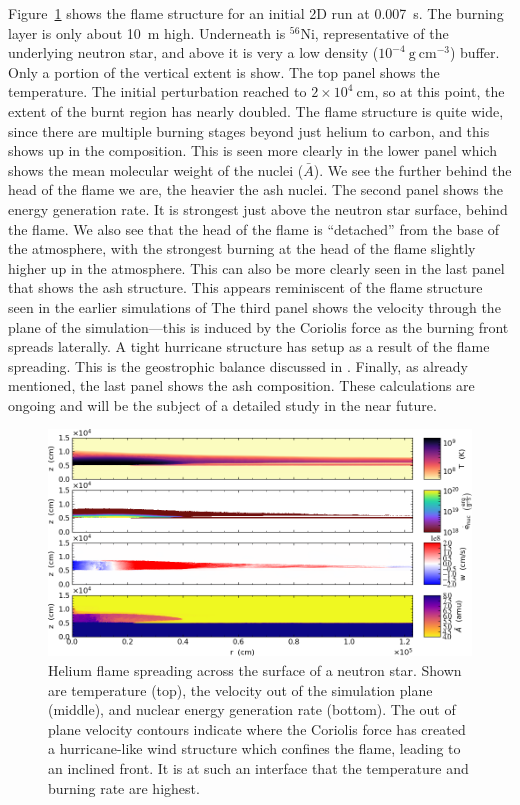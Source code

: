 \documentclass[a4paper]{jpconf}
\newcommand{\isot}[2]{$^{#2}\mathrm{#1}$}
\newcommand{\gcc}{\mathrm{g~cm^{-3} }}
\newcommand{\MarginPar}[1]{\marginpar{\vskip-\baselineskip\raggedright\tiny\sffamily\hrule\smallskip{\color{red}#1}\par\smallskip\hrule}}
\begin{document}
Figure~\ref{fig:xrb} shows the flame structure for an initial 2D run
at 0.007~s.  The burning layer is only about 10~m high.  Underneath is
\isot{Ni}{56}, representative of the underlying neutron star, and
above it is very a low density ($10^{-4}~\gcc$) buffer.  Only a
portion of the vertical extent is show.  The top panel shows the
temperature.  The initial perturbation reached to $2\times
10^4~\mathrm{cm}$, so at this point, the extent of the burnt region
has nearly doubled.  The flame structure is quite wide, since there
are multiple burning stages beyond just helium to carbon, and this
shows up in the composition.  This is seen more clearly in the lower
panel which shows the mean molecular weight of the nuclei ($\bar{A}$).
We see the further behind the head of the flame we are, the heavier
the ash nuclei.  The second panel shows the energy generation rate.
It is strongest just above the neutron star surface, behind the flame.
We also see that the head of the flame is ``detached'' from the base
of the atmosphere, with the strongest burning at the head of the flame
slightly higher up in the atmosphere.  This can also be more clearly
seen in the last panel that shows the ash structure.  This appears
reminiscent of the flame structure seen in the earlier simulations of
\cite{cavecchi:2012} \MarginPar{Yuri, would you agree?}  The third
panel shows the velocity through the plane of the simulation---this is
induced by the Coriolis force as the burning front spreads laterally.
A tight hurricane structure has setup as a result of the flame
spreading.  This is the geostrophic balance discussed in
\cite{SPIT_ETAL02}.  Finally, as already mentioned, the last panel
shows the ash composition.  These calculations are ongoing and will be
the subject of a detailed study in the near future.

\begin{figure}
\centering
\includegraphics[width=0.95\linewidth]{xrb}
\caption{\label{fig:xrb} Helium flame spreading across the surface of
  a neutron star.  Shown are temperature (top), the velocity out of the
  simulation plane (middle), and nuclear energy generation rate
  (bottom).
  The out of plane velocity contours indicate where the Coriolis force
  has created a hurricane-like wind structure which confines the flame,
  leading to an inclined front. It is at such an interface that the
  temperature and burning rate are highest.
  }
\end{figure}
\end{document}
